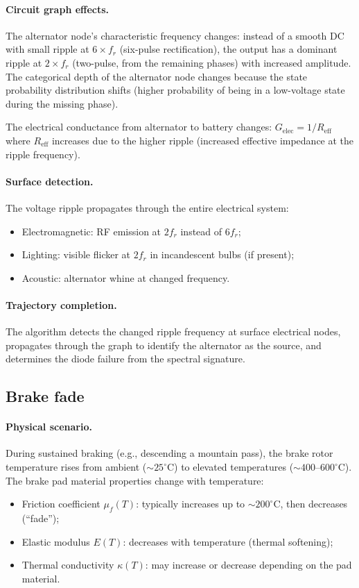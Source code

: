 \documentclass[twocolumn,10pt,a4paper]{article}
\theoremstyle{definition}
\theoremstyle{remark}
\begin{document}
\paragraph{Circuit graph effects.} The alternator node's characteristic frequency changes: instead of a smooth DC with small ripple at $6 \times f_r$ (six-pulse rectification), the output has a dominant ripple at $2 \times f_r$ (two-pulse, from the remaining phases) with increased amplitude. The categorical depth of the alternator node changes because the state probability distribution shifts (higher probability of being in a low-voltage state during the missing phase).

The electrical conductance from alternator to battery changes: $G_{\mathrm{elec}} = 1/R_{\mathrm{eff}}$ where $R_{\mathrm{eff}}$ increases due to the higher ripple (increased effective impedance at the ripple frequency).

\paragraph{Surface detection.} The voltage ripple propagates through the entire electrical system:
\begin{itemize}
\item Electromagnetic: RF emission at $2 f_r$ instead of $6 f_r$;
\item Lighting: visible flicker at $2 f_r$ in incandescent bulbs (if present);
\item Acoustic: alternator whine at changed frequency.
\end{itemize}

\paragraph{Trajectory completion.} The algorithm detects the changed ripple frequency at surface electrical nodes, propagates through the graph to identify the alternator as the source, and determines the diode failure from the spectral signature.

\subsection{Brake fade}\label{sec:brake_fade}

\paragraph{Physical scenario.} During sustained braking (e.g., descending a mountain pass), the brake rotor temperature rises from ambient ($\sim 25^\circ$C) to elevated temperatures ($\sim 400$--$600^\circ$C). The brake pad material properties change with temperature:
\begin{itemize}
\item Friction coefficient $\mu_f(T)$: typically increases up to $\sim 200^\circ$C, then decreases (``fade'');
\item Elastic modulus $E(T)$: decreases with temperature (thermal softening);
\item Thermal conductivity $\kappa(T)$: may increase or decrease depending on the pad material.
\end{itemize}
\end{document}
